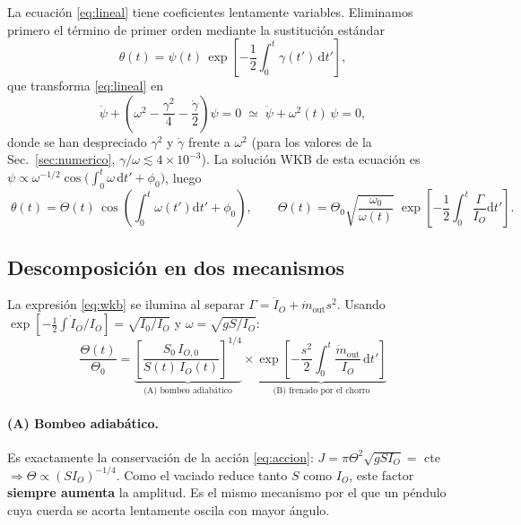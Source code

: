 \documentclass[11pt,a4paper]{article}
\newcommand{\dd}{\mathrm{d}}
\begin{document}
La ecuación \eqref{eq:lineal} tiene coeficientes lentamente variables. Eliminamos primero el
término de primer orden mediante la sustitución estándar
\begin{equation}
\theta(t) = \psi(t)\,\exp\left[-\frac12\int_0^t\gamma(t')\,\dd t'\right],
\end{equation}
que transforma \eqref{eq:lineal} en
\begin{equation}
\ddot\psi + \left(\omega^2 - \frac{\gamma^2}{4} - \frac{\dot\gamma}{2}\right)\psi = 0
\;\simeq\; \ddot\psi + \omega^2(t)\,\psi = 0 ,
\end{equation}
donde se han despreciado $\gamma^2$ y $\dot\gamma$ frente a $\omega^2$ (para los valores de la
Sec.~\ref{sec:numerico}, $\gamma/\omega \lesssim 4\times10^{-3}$).
La solución WKB de esta ecuación es
$\psi \propto \omega^{-1/2}\cos\!\big(\int_0^t\omega\,\dd t'+\phi_0\big)$, luego
\begin{equation}
\boxed{\;
\theta(t) = \Theta(t)\,\cos\!\left(\int_0^t\!\omega(t')\dd t' + \phi_0\right),
\qquad
\Theta(t) = \Theta_0\sqrt{\frac{\omega_0}{\omega(t)}}\;
\exp\!\left[-\frac12\int_0^t\!\frac{\Gamma}{I_O}\dd t'\right].}
\label{eq:wkb}
\end{equation}

\subsection{Descomposición en dos mecanismos}

La expresión \eqref{eq:wkb} se ilumina al separar $\Gamma=\dot I_O + \dot m_{\text{out}}s^2$.
Usando $\exp\left[-\frac12\int \dot I_O/I_O\right]=\sqrt{I_0/I_O}$ y $\omega=\sqrt{gS/I_O}$:
\begin{equation}
\boxed{\;
\frac{\Theta(t)}{\Theta_0} =
\underbrace{\left[\frac{S_0\,I_{O,0}}{S(t)\,I_O(t)}\right]^{1/4}}_{\text{(A) bombeo adiabático}}
\times
\underbrace{\exp\left[-\frac{s^2}{2}\int_0^t \frac{\dot m_{\text{out}}}{I_O}\,\dd t'\right]}
_{\text{(B) frenado por el chorro}} \;}
\label{eq:amplitud}
\end{equation}

\paragraph{(A) Bombeo adiabático.} Es exactamente la conservación de la acción
\eqref{eq:accion}: $J=\pi\Theta^2\sqrt{gSI_O}=$ cte $\Rightarrow \Theta\propto (S I_O)^{-1/4}$.
Como el vaciado reduce tanto $S$ como $I_O$, este factor \textbf{siempre aumenta} la amplitud. Es
el mismo mecanismo por el que un péndulo cuya cuerda se acorta lentamente oscila con mayor ángulo.
\end{document}
